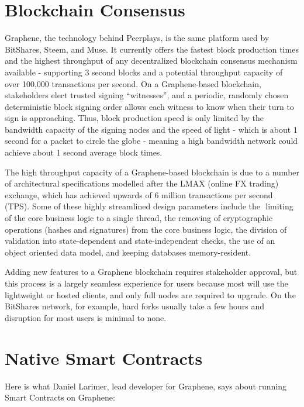 \documentclass[a4paper,titlepage,final]{article}
\begin{document}
\section{Blockchain Consensus}

Graphene, the technology behind Peerplays, is the same platform used by BitShares, Steem, and Muse. It currently offers the fastest block production times and the highest throughput of any decentralized blockchain consensus mechanism available - supporting 3 second blocks and a potential throughput capacity of over 100,000 transactions per second.\cite{3}​ On a Graphene-based blockchain, stakeholders elect trusted signing “witnesses”, and a periodic, randomly chosen deterministic block signing order allows each witness to know when their turn to sign is approaching. Thus, block production speed is only limited by the bandwidth capacity of the signing nodes and the speed of light - which is about 1 second for a packet to circle the globe - meaning a high bandwidth network could achieve about 1 second average block times.

The high throughput capacity of a Graphene-based blockchain is due to a number of architectural specifications modelled after the LMAX (online FX trading) exchange, which has achieved upwards of 6 million transactions per second (TPS).\cite{4}​ Some of these highly streamlined design parameters include the ​ limiting of the core business logic to a single thread, the removing of cryptographic operations (hashes and signatures) from the core business logic, the division of validation into state-dependent and state-independent checks, the use of an object oriented data model, and keeping databases memory-resident.​\cite{5}

Adding new features to a Graphene blockchain requires stakeholder approval, but this process is a largely seamless experience for users because most will use the lightweight or hosted clients, and only full nodes are required to upgrade. On the BitShares network, for example, hard forks usually take a few hours and disruption for most users is minimal to none.

\section{Native Smart Contracts}

Here is what Daniel Larimer, lead developer for Graphene, says about running Smart Contracts on Graphene:
\end{document}
